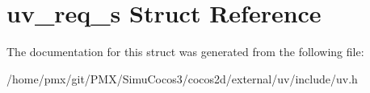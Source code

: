 \hypertarget{structuv__req__s}{}\section{uv\+\_\+req\+\_\+s Struct Reference}
\label{structuv__req__s}


The documentation for this struct was generated from the following file\+:\begin{DoxyCompactItemize}
\item 
/home/pmx/git/\+P\+M\+X/\+Simu\+Cocos3/cocos2d/external/uv/include/uv.\+h\end{DoxyCompactItemize}
